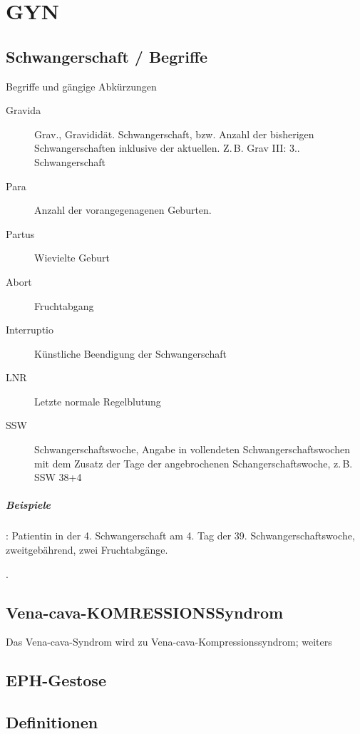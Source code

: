 \documentclass[
ngerman,
paper=a4,
asymmetric,
fontsize=10pt,
draft=false,
numbers=noenddot,
bibtotocnumbered,
footnotes=multiple,
]{scrreprt}
\newcommand{\jNEU}{\vspace{6pt}\noindent{\color{green}\sffamily\textbf{ADDED}\hrulefill\newline}}
\newcommand{\jNEUende}{\newline{\color{green}\rule{\linewidth}{3pt}\newline}}
\begin{document}
\section{GYN}
\subsection{Schwangerschaft / Begriffe}
\jNEU
\Text
{Begriffe und gängige Abkürzungen}
{
\begin{description}
  \item[Gravida]  Grav., Gravididät.
  Schwangerschaft, bzw. Anzahl der bisherigen
  Schwangerschaften inklusive der aktuellen. Z.\,B. Grav
  III: 3.. Schwangerschaft
  \item[Para] Anzahl der vorangegenagenen Geburten.
  \item[Partus] Wievielte Geburt
  \item[Abort] Fruchtabgang
  \item[Interruptio] Künstliche Beendigung der Schwangerschaft
  \item[LNR]  Letzte normale Regelblutung
  \item[SSW] Schwangerschaftswoche, Angabe in vollendeten
  Schwangerschaftswochen mit dem Zusatz der Tage der
  angebrochenen Schangerschaftswoche, z.\,B. SSW 38+4
\end{description}

\subparagraph{Beispiele} : Patientin in der
4. Schwangerschaft am 4. Tag der 39. Schwangerschaftswoche,
zweitgebährend, zwei Fruchtabgänge.

}
{}
{}
{}
{}
.
\jNEUende

\subsection{Vena-cava-KOMRESSIONSSyndrom}
Das Vena-cava-Syndrom wird zu Vena-cava-Kompressionssyndrom; weiters



\subsection{EPH-Gestose}



\subsection{Definitionen}
\end{document}
